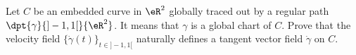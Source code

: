 \begin{exercice}\label{exo005}

  Let $C$ be an embedded curve in $\eR^2$ globally traced out by a regular path
$\dpt{ \gamma }{ ]-1,1[ }{ \eR^2 }$. It means that $\gamma$ is a global chart of $C$. Prove that the velocity field $\{\dot{\gamma}(t)\}_{t\in]-1,1[}$
naturally defines a tangent vector field $\dot{\gamma}$ on $C$.

\end{exercice}
